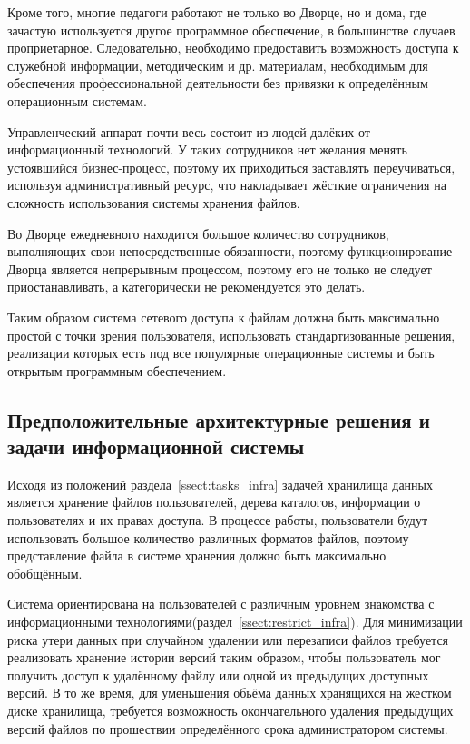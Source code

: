 \documentclass[utf8,usehyperref,12pt]{G7-32}
\begin{document}
Кроме того, многие педагоги работают не только во Дворце, но и дома, где зачастую используется другое программное обеспечение, в большинстве случаев проприетарное. Следовательно, необходимо предоставить возможность доступа к служебной информации, методическим и др. материалам, необходимым для обеспечения профессиональной деятельности без привязки к определённым операционным системам.

Управленческий аппарат почти весь состоит из людей далёких от информационный технологий. У таких сотрудников нет желания менять устоявшийся бизнес-процесс, поэтому их приходиться заставлять переучиваться, используя административный ресурс, что накладывает жёсткие ограничения на сложность использования системы хранения файлов.


Во Дворце ежедневного находится большое количество сотрудников, выполняющих свои непосредственные обязанности, поэтому функционирование Дворца является непрерывным процессом, поэтому его не только не следует приостанавливать,
а категорически не рекомендуется это делать.

Таким образом система сетевого доступа к файлам должна быть максимально простой с точки зрения пользователя, использовать стандартизованные решения, реализации которых есть под все популярные операционные системы и быть открытым программным обеспечением.

\subsection{Предположительные архитектурные решения и задачи информационной системы}
Исходя из положений раздела~\ref{ssect:tasks_infra} задачей хранилища данных является хранение файлов пользователей, дерева каталогов, информации о пользователях и их правах доступа. В процессе работы, пользователи будут использовать большое количество различных форматов файлов, поэтому представление файла в системе хранения должно быть максимально обобщённым. 

Система ориентирована на пользователей с различным уровнем знакомства с информационными технологиями(раздел~\ref{ssect:restrict_infra}). Для минимизации риска утери данных при случайном удалении или перезаписи файлов требуется реализовать хранение истории версий таким образом, чтобы пользователь мог получить доступ к удалённому файлу или одной из предыдущих доступных версий. В то же время, для уменьшения обьёма данных хранящихся на жестком диске хранилища, требуется возможность окончательного удаления предыдущих версий файлов по прошествии определённого срока администратором системы.
\end{document}
